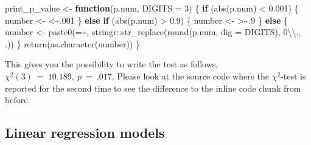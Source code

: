 \documentclass[
  11pt,
  a4paper,
  twoside]{scrbook}
\newenvironment{Shaded}{\begin{snugshade}}{\end{snugshade}}
\newcommand{\AttributeTok}[1]{\textcolor[rgb]{0.77,0.63,0.00}{#1}}
\newcommand{\ControlFlowTok}[1]{\textcolor[rgb]{0.13,0.29,0.53}{\textbf{#1}}}
\newcommand{\DecValTok}[1]{\textcolor[rgb]{0.00,0.00,0.81}{#1}}
\newcommand{\FloatTok}[1]{\textcolor[rgb]{0.00,0.00,0.81}{#1}}
\newcommand{\FunctionTok}[1]{\textcolor[rgb]{0.00,0.00,0.00}{#1}}
\newcommand{\NormalTok}[1]{#1}
\newcommand{\OtherTok}[1]{\textcolor[rgb]{0.56,0.35,0.01}{#1}}
\newcommand{\SpecialCharTok}[1]{\textcolor[rgb]{0.00,0.00,0.00}{#1}}
\newcommand{\StringTok}[1]{\textcolor[rgb]{0.31,0.60,0.02}{#1}}
\begin{document}
\begin{Shaded}
\begin{Highlighting}[]
\NormalTok{print\_p\_value }\OtherTok{\textless{}{-}} \ControlFlowTok{function}\NormalTok{(p.num, }\AttributeTok{DIGITS =} \DecValTok{3}\NormalTok{) \{}
    \ControlFlowTok{if}\NormalTok{ (}\FunctionTok{abs}\NormalTok{(p.num) }\SpecialCharTok{\textless{}} \FloatTok{0.001}\NormalTok{) \{}
\NormalTok{        number }\OtherTok{\textless{}{-}} \StringTok{\textquotesingle{}\textless{}\textasciitilde{}.001\textquotesingle{}}
\NormalTok{    \} }\ControlFlowTok{else} \ControlFlowTok{if}\NormalTok{ (}\FunctionTok{abs}\NormalTok{(p.num) }\SpecialCharTok{\textgreater{}} \FloatTok{0.9}\NormalTok{) \{}
\NormalTok{        number }\OtherTok{\textless{}{-}} \StringTok{\textquotesingle{}\textgreater{}\textasciitilde{}.9\textquotesingle{}}
\NormalTok{    \} }\ControlFlowTok{else}\NormalTok{ \{}
\NormalTok{        number }\OtherTok{\textless{}{-}} \FunctionTok{paste0}\NormalTok{(}\StringTok{\textquotesingle{}=\textasciitilde{}\textquotesingle{}}\NormalTok{,}
\NormalTok{                         stringr}\SpecialCharTok{::}\FunctionTok{str\_replace}\NormalTok{(}\FunctionTok{round}\NormalTok{(p.num, }\AttributeTok{dig =}\NormalTok{ DIGITS),}
                                              \StringTok{\textquotesingle{}0}\SpecialCharTok{\textbackslash{}\textbackslash{}}\StringTok{.\textquotesingle{}}\NormalTok{, }\StringTok{\textquotesingle{}.\textquotesingle{}}\NormalTok{))}
\NormalTok{    \}}
    \FunctionTok{return}\NormalTok{(}\FunctionTok{as.character}\NormalTok{(number))}
\NormalTok{\}}
\end{Highlighting}
\end{Shaded}

\linespread{1}

This gives you the possibility to write the test as follows, \(\chi^2(3)~=~10.189,~p~=~.017\). Please look at the source code where the \(\chi^2\)-test is reported for the second time to see the difference to the inline code chunk from before.

\hypertarget{reg-models}{%
\subsection{Linear regression models}\label{reg-models}}
\end{document}
